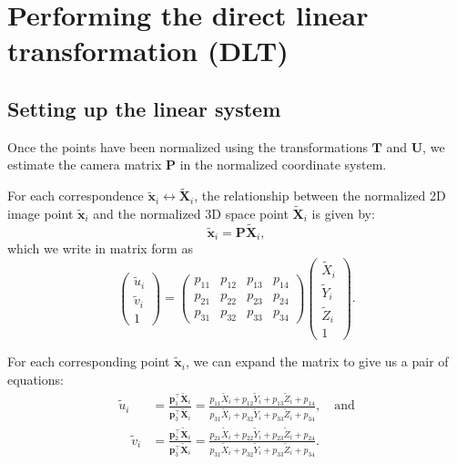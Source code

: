 \documentclass[12pt]{article}
\begin{document}
\section{Performing the direct linear transformation (DLT)}

\subsection{Setting up the linear system}

Once the points have been normalized using the transformations \( \mathbf{T} \) and \( \mathbf{U} \), we estimate the camera matrix \( \mathbf{P} \) in the normalized coordinate system. 

For each correspondence \( \tilde{\mathbf{x}}_i \leftrightarrow \tilde{\mathbf{X}}_i \), the relationship between the normalized 2D image point \( \tilde{\mathbf{x}}_i \) and the normalized 3D space point \( \tilde{\mathbf{X}}_i \) is given by:
$$
\tilde{\mathbf{x}}_i = \mathbf{P} \tilde{\mathbf{X}}_i,
$$
which we write in matrix form as
$$
\begin{pmatrix} 
    \tilde{u}_i \\ \tilde{v}_i \\ 1
\end{pmatrix} = 
\begin{pmatrix} 
p_{11} & p_{12} & p_{13} & p_{14} \\
p_{21} & p_{22} & p_{23} & p_{24} \\
p_{31} & p_{32} & p_{33} & p_{34} 
\end{pmatrix}
\begin{pmatrix} 
\tilde{X}_i \\ \tilde{Y}_i \\ \tilde{Z}_i \\ 1
\end{pmatrix}.
$$

For each corresponding point $\tilde{\mathbf{x}}_i$, we can expand the matrix to give us a pair of equations:
\begin{align*}
\tilde{u}_i &= \frac{\mathbf{p}_1^\top \tilde{\mathbf{X}}_i}{\mathbf{p}_3^\top \tilde{\mathbf{X}}_i}
= \frac{p_{11} \tilde{X}_i + p_{12} \tilde{Y}_i + p_{13} \tilde{Z}_i + p_{14}}{p_{31} \tilde{X}_i + p_{32} \tilde{Y}_i + p_{33} \tilde{Z}_i + p_{34}},\quad\text{and}
\\
\quad \tilde{v}_i &= \frac{\mathbf{p}_2^\top \tilde{\mathbf{X}}_i}{\mathbf{p}_3^\top \tilde{\mathbf{X}}_i}
= \frac{p_{21} \tilde{X}_i + p_{22} \tilde{Y}_i + p_{23} \tilde{Z}_i + p_{24}}{p_{31} \tilde{X}_i + p_{32} \tilde{Y}_i + p_{33} \tilde{Z}_i + p_{34}}.
\end{align*}
\end{document}
